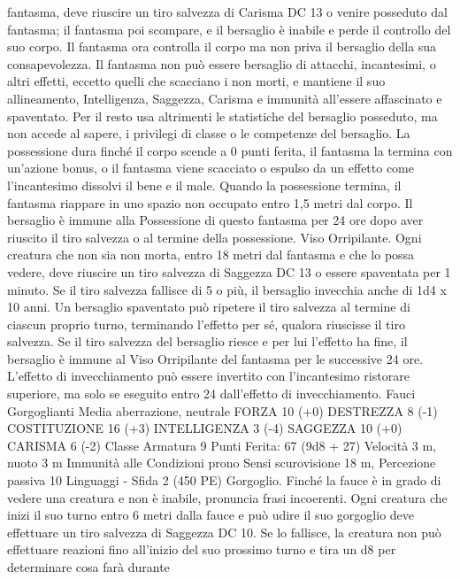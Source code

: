 \begin{multicols}{2}
fantasma, deve riuscire un tiro salvezza di Carisma DC 13 o venire
posseduto dal fantasma; il fantasma poi scompare, e il bersaglio è inabile
e perde il controllo del suo corpo. Il fantasma ora controlla il corpo ma
non priva il bersaglio della sua consapevolezza. Il fantasma non può
essere bersaglio di attacchi, incantesimi, o altri effetti, eccetto quelli che
scacciano i non morti, e mantiene il suo allineamento, Intelligenza,
Saggezza, Carisma e immunità all’essere affascinato e spaventato. Per il
resto usa altrimenti le statistiche del bersaglio posseduto, ma non accede
al sapere, i privilegi di classe o le competenze del bersaglio.
La possessione dura finché il corpo scende a 0 punti ferita, il fantasma la
termina con un’azione bonus, o il fantasma viene scacciato o espulso da un
effetto come l’incantesimo dissolvi il bene e il male. Quando la possessione
termina, il fantasma riappare in uno spazio non occupato entro 1,5 metri dal
corpo. Il bersaglio è immune alla Possessione di questo fantasma per 24 ore
dopo aver riuscito il tiro salvezza o al termine della possessione.
Viso Orripilante. Ogni creatura che non sia non morta, entro 18 metri
dal fantasma e che lo possa vedere, deve riuscire un tiro salvezza di
Saggezza DC 13 o essere spaventata per 1 minuto. Se il tiro salvezza
fallisce di 5 o più, il bersaglio invecchia anche di 1d4 x 10 anni. Un
bersaglio spaventato può ripetere il tiro salvezza al termine di ciascun
proprio turno, terminando l’effetto per sé, qualora riuscisse il tiro
salvezza. Se il tiro salvezza del bersaglio riesce e per lui l’effetto ha fine, il
bersaglio è immune al Viso Orripilante del fantasma per le successive 24
ore. L’effetto di invecchiamento può essere invertito con l’incantesimo
ristorare superiore, ma solo se eseguito entro 24 dall’effetto di
invecchiamento.
Fauci Gorgoglianti
Media aberrazione, neutrale
FORZA 10 (+0)
DESTREZZA 8 (-1)
COSTITUZIONE 16 (+3)
INTELLIGENZA 3 (-4)
SAGGEZZA 10 (+0)
CARISMA 6 (-2)
Classe Armatura 9
\hspace*{0pt}\hfill{Punti Ferita}: 67 (9d8 + 27)
Velocità 3 m, nuoto 3 m
Immunità alle Condizioni prono
Sensi scurovisione 18 m, Percezione passiva 10
Linguaggi -
Sfida 2 (450 PE)
Gorgoglio. Finché la fauce è in grado di vedere una creatura e
non è inabile, pronuncia frasi incoerenti. Ogni creatura che inizi
il suo turno entro 6 metri dalla fauce e può udire il suo gorgoglio
deve effettuare un tiro salvezza di Saggezza DC 10. Se lo
fallisce, la creatura non può effettuare reazioni fino all’inizio del
suo prossimo turno e tira un d8 per determinare cosa farà durante

\end{multicols}
